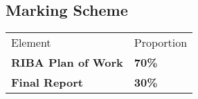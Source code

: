 \subsection*{Marking Scheme}

\begin{table}[h!]
     \begin{center}
     \begin{tabular}{p{5cm}  p{5cm} }
     \toprule
      \textbf\large{Element} & \textbf\large{Proportion} \\ 
    \cmidrule(r){1-1}\cmidrule(lr){2-2}
      \textbf{RIBA Plan of Work} & \textbf{70\%}\\
      \textbf{Final Report} & \textbf{30\%}
      \\ \bottomrule
      \end{tabular}
      \label{tbl:markSchemeAsmt3}
      \end{center}
 \end{table}

